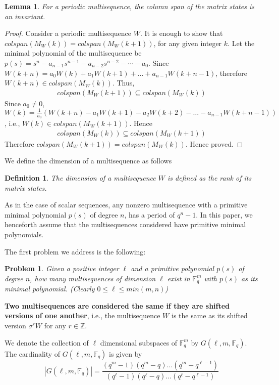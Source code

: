 \documentclass[letterpaper, 12 pt]{article}  \usepackage{amssymb}
\newtheorem{lemma}[theorem]{Lemma}
\newtheorem{definition}[theorem]{Definition}
\newtheorem{problem}{Problem}
\newcommand{\F}{\mathbb{F}}
\begin{document}
\begin{lemma}
\label{span}
For a periodic multisequence, the column span of the matrix states is an
invariant.
\end{lemma}

\begin{proof}
Consider a periodic multisequence $W$. It is enough to show that
$colspan(M_W(k)) = colspan(M_W(k+1))$, for any given integer $k$.
 Let the minimal polynomial of the multisequence be $p(s) =  s^n -
a_{n-1}s^{n-1} - a_{n-2}s^{n-2} - \cdots - a_0 $. Since $W({k+n}) = a_0W(k)
+ a_1W({k+1}) + \ldots + a_{n-1}W({k+n-1})$, therefore $W({k+n}) \in
colspan(M_W(k))$.
Thus,
\begin{eqnarray*}
 colspan(M_W(k+1)) \subseteq colspan(M_W(k)) 
\end{eqnarray*}
Since $a_0 \neq 0$, $W(k) = \frac{1}{a_0} (W({k+n}) - a_1 W({k+1}) - a_2W({k+2})
- \ldots -
a_{n-1}W({k+n-1}))$, i.e., $W(k) \in colspan(M_W(k+1))$. Hence 
\begin{eqnarray*}
 colspan(M_W(k)) \subseteq colspan(M_W(k+1)) 
\end{eqnarray*}
Therefore $colspan(M_W(k+1)) = colspan(M_W(k))$. Hence proved.  


\end{proof}

We define the dimension of a multisequence as follows
\begin{definition}
The dimension of a multisequence $W$ is defined as the rank of its matrix
states.
\end{definition}

As in the case of scalar sequences, any nonzero multisequence with a primitive
minimal polynomial $p(s)$ of degree $n$, has a period of $q^n-1$.
In this paper, we henceforth assume that the multisequences considered
have primitive minimal polynomials.

The first problem we address is the following:
\begin{problem}
 Given a positive integer $\ell$ and a primitive polynomial $p(s)$ of degree
$n$, how many
multisequences of dimension $\ell$ exist in $ \F_q^m$ with $p(s)$ as its minimal
polynomial. (Clearly $0 \leq \ell \leq min(m,n)$)
\end{problem}
 
 {\bf Two multisequences are considered the same if they
are
shifted versions of one another}, i.e., the multisequence $W$ is the same as 
its shifted version $\sigma^r W$  for any $r \in \mathbb{Z}$. 

 We denote the collection of $\ell$ dimensional
subspaces of
$\F_q^m$ by $G(\ell,m,\F_q)$. The cardinality of  $G(\ell,m,\F_q)$ is given by
\begin{equation}
 |G(\ell,m,\F_q)| =
\frac{(q^m-1)(q^m-q)\ldots(q^m-q^{\ell-1})}{(q^\ell-1)(q^\ell-q)\ldots(q^\ell-q^
{\ell-1})}
\end{equation}
 
\end{document}

